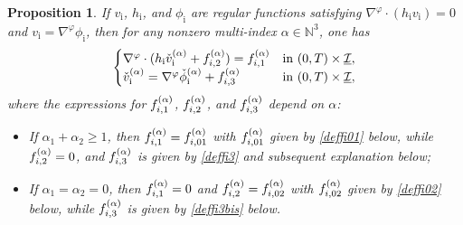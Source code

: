 \documentclass[11pt]{article}
\newcommand{\cI}{{\mathcal I}}
\newcommand{\ul}[1]{\underline{#1}}
\newtheorem{proposition}[theorem]{Proposition}
\theoremstyle{definition}
\begin{document}
\begin{proposition}\label{propGUinterior}
If $v_\mathrm{i}$, $h_\mathrm{i}$, and $\phi_\mathrm{i}$ are regular functions satisfying $\nabla^\varphi\cdot (h_\mathrm{i}v_\mathrm{i})=0$ and
$v_\mathrm{i}=\nabla^\varphi \phi_\mathrm{i}$, then for any nonzero multi-index $\alpha\in {\mathbb N}^3$, one has
\begin{equation}\label{QLSWEi}
\begin{cases}
\nabla^\varphi\cdot(h_\mathrm{i}\check{v}_\mathrm{i}^{(\alpha)}+f_{{\rm i},2}^{(\alpha)}) = f_{{\rm i},1}^{(\alpha)} &\text{in } (0,T)\times\ul{\cI}, \\
\check{v}_\mathrm{i}^{(\alpha)} = \nabla^\varphi \check{\phi}_\mathrm{i}^{(\alpha)}+f_{{\rm i},3}^{(\alpha)} &\text{in } (0,T)\times\ul{\cI},
\end{cases}
\end{equation}
where the expressions for $f_{{\rm i},1}^{(\alpha)}$, $f_{{\rm i},2}^{(\alpha)}$, and $f_{{\rm i},3}^{(\alpha)}$ depend on $\alpha$:
\begin{itemize}
\item
If $\alpha_1+\alpha_2\geq 1$,
then $f_{{\rm i},1}^{(\alpha)}=f_{{\rm i},01}^{(\alpha)} $ with $f_{{\rm i},01}^{(\alpha)} $ given by \eqref{deffi01} below,
while $f_{{\rm i},2}^{(\alpha)}=0$, and $f_{{\rm i},3}^{(\alpha)}$ is given by \eqref{deffi3} and subsequent explanation below;
\item
If $\alpha_1=\alpha_2=0$,
then $f_{{\rm i},1}^{(\alpha)}=0 $ and $f_{{\rm i},2}^{(\alpha)}=f_{{\rm i},02}^{(\alpha)} $ with $f_{{\rm i},02}^{(\alpha)} $ given by \eqref{deffi02} below,
while $f_{{\rm i},3}^{(\alpha)}$ is given by \eqref{deffi3bis} below.
\end{itemize}
\end{proposition}
\end{document}

